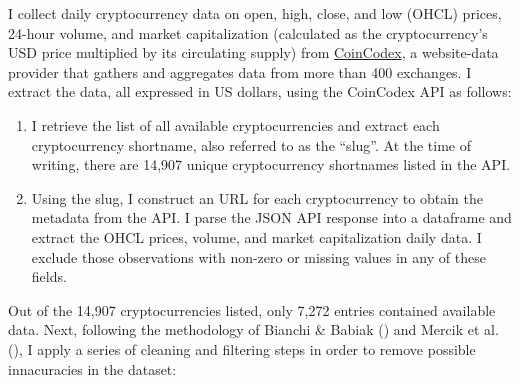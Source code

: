 \documentclass[
  12pt,
  a4paper,
  openany]{scrbook}
\begin{document}
I collect daily cryptocurrency data on open, high, close, and low (OHCL)
prices, 24-hour volume, and market capitalization (calculated as the
cryptocurrency's USD price multiplied by its circulating supply) from
\href{https://coincodex.com/}{CoinCodex}, a website-data provider that
gathers and aggregates data from more than 400 exchanges. I extract the
data, all expressed in US dollars, using the CoinCodex API as follows:

\begin{enumerate}
\def\labelenumi{\arabic{enumi}.}
\item
  I retrieve the list of all available cryptocurrencies and extract each
  cryptocurrency shortname, also referred to as the ``slug''. At the
  time of writing, there are 14,907 unique cryptocurrency shortnames
  listed in the API.
\item
  Using the slug, I construct an URL for each cryptocurrency to obtain
  the metadata from the API. I parse the JSON API response into a
  dataframe and extract the OHCL prices, volume, and market
  capitalization daily data. I exclude those observations with non-zero
  or missing values in any of these fields.
\end{enumerate}

Out of the 14,907 cryptocurrencies listed, only 7,272 entries contained
available data. Next, following the methodology of Bianchi \& Babiak
() and Mercik
et al.
(),
I apply a series of cleaning and filtering steps in order to remove
possible innacuracies in the dataset:
\end{document}
